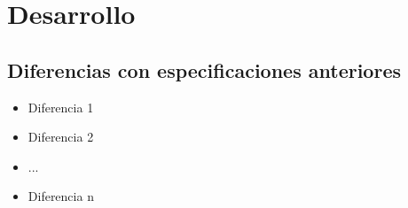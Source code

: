 \section{Desarrollo}

\subsection{Diferencias con especificaciones anteriores}

\begin{itemize}
	\item Diferencia 1
	\item Diferencia 2
	\item ...
	\item Diferencia n
\end{itemize}




